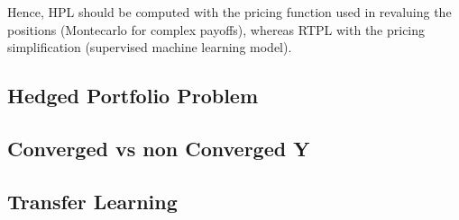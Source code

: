 Hence, HPL should be computed with the pricing function used in revaluing the positions (Montecarlo for complex payoffs), whereas RTPL with the pricing simplification (supervised machine learning model). 



\subsection{Hedged Portfolio Problem}
\subsection{Converged vs non Converged Y}
\subsection{Transfer Learning}





